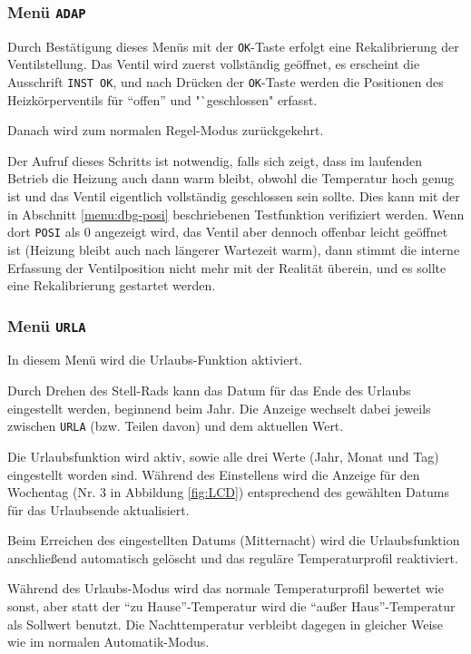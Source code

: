 \documentclass[a4paper]{article}
\begin{document}
\subsubsection {
  Menü \texttt{ADAP}
}

Durch Bestätigung dieses Menüs mit der \texttt{OK}-Taste erfolgt
eine Rekalibrierung der Ventilstellung.  Das Ventil wird zuerst
vollständig geöffnet, es erscheint die Ausschrift \texttt{INST OK},
und nach Drücken der \texttt{OK}-Taste werden die Positionen des
Heizkörperventils für "`offen"' und "`geschlossen" erfasst.

Danach wird zum normalen Regel-Modus zurückgekehrt.

Der Aufruf dieses Schritts ist notwendig, falls sich zeigt, dass im
laufenden Betrieb die Heizung auch dann warm bleibt, obwohl die
Temperatur hoch genug ist und das Ventil eigentlich vollständig
geschlossen sein sollte.  Dies kann mit der in Abschnitt
\ref{menu:dbg-posi} beschriebenen Testfunktion verifiziert werden.
Wenn dort \texttt{POSI} als 0 angezeigt wird, das Ventil aber dennoch
offenbar leicht geöffnet ist (Heizung bleibt auch nach längerer
Wartezeit warm), dann stimmt die interne Erfassung der Ventilposition
nicht mehr mit der Realität überein, und es sollte eine Rekalibrierung
gestartet werden.

\subsubsection {
  Menü \texttt{URLA}
}

In diesem Menü wird die Urlaubs-Funktion aktiviert.

Durch Drehen des Stell-Rads kann das Datum für das Ende des Urlaubs
eingestellt werden, beginnend beim Jahr.  Die Anzeige wechselt dabei
jeweils zwischen \texttt{URLA} (bzw. Teilen davon) und dem aktuellen
Wert.

Die Urlaubsfunktion wird aktiv, sowie alle drei Werte (Jahr, Monat
und Tag) eingestellt worden sind.  Während des Einstellens wird
die Anzeige für den Wochentag (Nr. 3 in Abbildung \ref{fig:LCD}) entsprechend
des gewählten Datums für das Urlaubsende aktualisiert.

Beim Erreichen des eingestellten Datums (Mitternacht) wird die
Urlaubsfunktion anschließend automatisch gelöscht und das reguläre
Temperaturprofil reaktiviert.

Während des Urlaubs-Modus wird das normale Temperaturprofil bewertet
wie sonst, aber statt der "`zu Hause"'-Temperatur wird die "`außer
Haus"'-Temperatur als Sollwert benutzt.  Die Nachttemperatur
verbleibt dagegen in gleicher Weise wie im normalen Automatik-Modus.
\end{document}
